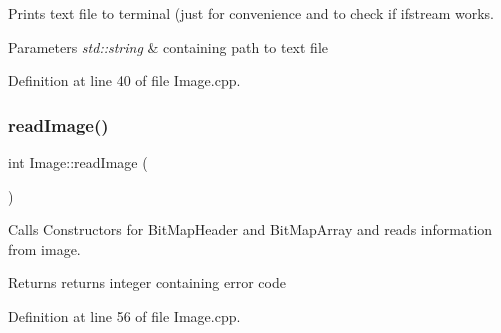 Prints text file to terminal (just for convenience and to check if ifstream works. 


\begin{DoxyParams}{Parameters}
{\em std\+::string} & containing path to text file \\
\hline
\end{DoxyParams}


Definition at line 40 of file Image.\+cpp.

\mbox{\label{classImage_ac0aa1f41cb368d87b20dd38839218d93}} 
\subsubsection{\texorpdfstring{readImage()}{readImage()}}
{\footnotesize\ttfamily int Image\+::read\+Image (\begin{DoxyParamCaption}{ }\end{DoxyParamCaption})}



Calls Constructors for Bit\+Map\+Header and Bit\+Map\+Array and reads information from image. 

\begin{DoxyReturn}{Returns}
returns integer containing error code 
\end{DoxyReturn}


Definition at line 56 of file Image.\+cpp.

